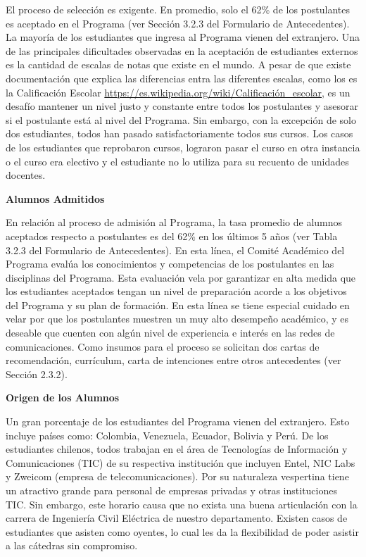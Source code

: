 El proceso de selección es exigente. En promedio, solo el 62\% de los postulantes es aceptado en el
Programa (ver Sección 3.2.3 del Formulario de Antecedentes). La mayoría de los estudiantes que ingresa
al Programa vienen del extranjero. Una de las principales dificultades observadas en la aceptación 
de estudiantes externos es la cantidad de escalas de notas que existe en el mundo. A pesar de que existe
documentación que explica las diferencias entra las diferentes escalas, como los es la Calificación Escolar
\url{https://es.wikipedia.org/wiki/Calificación_escolar}, es un desafío mantener un nivel justo y constante
entre todos los postulantes y asesorar si el postulante está al nivel del Programa. Sin embargo, con la
excepción de solo dos estudiantes, todos han pasado satisfactoriamente todos sus cursos. Los casos de los
estudiantes que reprobaron cursos, lograron pasar el curso en otra instancia o el curso era electivo y el
estudiante no lo utiliza para su recuento de unidades docentes.

\noindent\textbf{Alumnos Admitidos}

En relación al proceso de admisión al Programa, la tasa promedio de
alumnos aceptados respecto a postulantes es del 62\% en los últimos 5 años (ver Tabla 3.2.3
del Formulario de Antecedentes). En esta línea, el Comité Académico del Programa evalúa los
conocimientos y competencias de los postulantes en las disciplinas del Programa. Esta evaluación
vela por garantizar en alta medida que los estudiantes aceptados tengan un nivel de preparación
acorde a los objetivos del Programa y su plan de formación. En esta línea se tiene especial cuidado
en velar por que los postulantes muestren un muy alto desempeño académico, y es deseable que
cuenten con algún nivel de experiencia e interés en las redes de comunicaciones. Como insumos para el proceso
se solicitan dos cartas de recomendación, currículum, carta de intenciones entre otros antecedentes
(ver Sección 2.3.2).

\noindent\textbf{Origen de los Alumnos}

Un gran porcentaje de los estudiantes del Programa vienen del extranjero. Esto incluye países como:
Colombia, Venezuela, Ecuador, Bolivia y Perú. De los estudiantes chilenos, todos trabajan en el 
área de Tecnologías de Información y Comunicaciones (TIC) de su respectiva institución que incluyen Entel, NIC Labs y 
Zweicom (empresa de telecomunicaciones). Por su naturaleza vespertina tiene un atractivo grande 
para personal de empresas privadas y otras instituciones TIC. Sin embargo, este horario causa que no 
exista una buena articulación con la carrera de Ingeniería Civil Eléctrica de nuestro departamento. Existen
casos de estudiantes que asisten como oyentes, lo cual les da la flexibilidad de poder asistir a las cátedras
sin compromiso.

